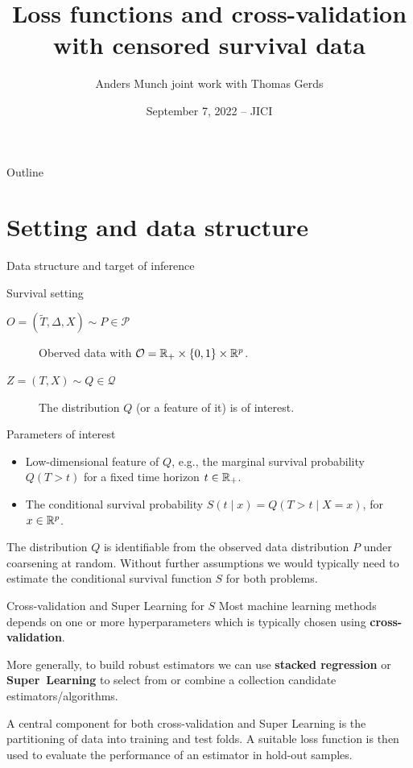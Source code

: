 \documentclass[smaller]{beamer}\usepackage{listings}
\institute{PhD Student, Section of Biostatistics \\ University of Copenhagen}
\author{Anders Munch \newline \small joint work with Thomas Gerds}
\date{September 7, 2022 -- JICI}
\title{Loss functions and cross-validation with censored survival data}
\begin{document}
\maketitle
\begin{frame}{Outline}
\tableofcontents
\end{frame}

\section{Setting and data structure}
\label{sec:org76a4680}
\begin{frame}[label={sec:orga03934a}]{Data structure and target of inference}
\small
\begin{block}{Survival setting}
\begin{description}
\item[{\(O = (\tilde T, \Delta, X) \sim P \in \mathcal{P}\)}] Oberved data with \(\mathcal{O} = \mathbb{R}_+
  \times \{0,1\} \times \mathbb{R}^p\).
\item[{\(Z = (T, X) \sim Q \in \mathcal{Q}\)}] The distribution \(Q\) (or a feature of it) is of interest.
\end{description}
\end{block}

\begin{block}{Parameters of interest}
\begin{itemize}
\item Low-dimensional feature of \(Q\), e.g., the marginal survival probability \(Q(T > t)\) for a fixed
time horizon \(t \in \mathbb{R}_+\).
\item The conditional survival probability \(S(t \mid x) = Q(T > t \mid X=x)\), for \(x \in \mathbb{R}^p\).
\end{itemize}

\hfill

The distribution \(Q\) is identifiable from the observed data distribution \(P\) under coarsening at
random. Without further assumptions we would typically need to estimate the conditional survival
function \(S\) for both problems.
\end{block}
\end{frame}

\begin{frame}[label={sec:orgc3e59cc}]{Cross-validation and Super Learning for \(S\)}
Most machine learning methods depends on one or more hyperparameters which is typically chosen using
\textbf{cross-validation}.

\vfill

More generally, to build robust estimators we can use \textbf{stacked regression} or
\textbf{Super~Learning} \citep{breiman1996stacked,van2007super} to select from or combine a
collection candidate estimators/algorithms.

\vfill

A central component for both cross-validation and Super Learning is the partitioning of data into
training and test folds. A suitable loss function is then used to evaluate the performance of an
estimator in hold-out samples.
\end{frame}
\end{document}
